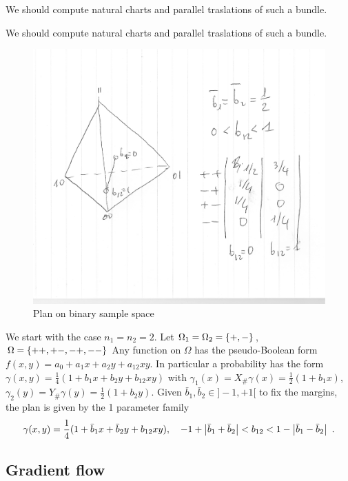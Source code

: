 \documentclass[12pt,a4paper]{amsart}
\begin{document}
\begin{remark}
  We should compute natural charts and parallel traslations of such a bundle.
\end{remark}

\begin{remark}
  We should compute natural charts and parallel traslations of such a bundle.
\end{remark}

\begin{exercise} 
%
  \begin{figure}[t]
    \centering
    \includegraphics[width=.4\textwidth]{plan2x2.pdf}
    \caption{Plan on binary sample space}
    \label{fig:1}
  \end{figure}
%
We start with the case $n_1=n_2=2$. Let $\Omega_1=\Omega_2=\left\{ +,- \right\}$, $\Omega=\left\{ ++,+-,-+,-- \right\}$ Any function on $\Omega$ has the pseudo-Boolean form $f(x,y)=a_0+a_1 x + a_2 y + a_{12} xy$. In particular a probability has the form $\gamma(x,y) = \frac14(1+b_1x+b_2y+b_{12}xy)$ with $\gamma_1(x) = X_{\#}\gamma (x)= \frac12(1+b_1x)$, $\gamma_2(y) = Y_\# \gamma(y) = \frac12(1+b_2y)$. Given $\bar b_1, \bar b_2 \in ]-1,+1[$ to fix the margins, the plan is given by the 1 parameter family 
%
  \begin{equation*}
    \gamma(x,y) = \frac14(1+\bar b_1x+\bar b_2y+b_{12}xy), \quad -1 + \left| \bar b_1+\bar b_2 \right| < b_{12} < 1 - \left| \bar b_1 - \bar b_2 \right| \ .
  \end{equation*}
\end{exercise}

\subsection{Gradient flow}
\end{document}
